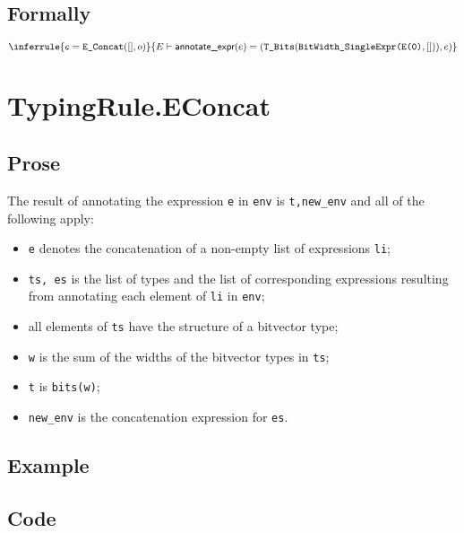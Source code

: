 \documentclass{book}
\newcommand\annotateexpr[1]{\textsf{annotate\_expr}(#1)}
\begin{document}
\begin{emptyformal}
    \subsection{Formally}
\[
\inferrule{e = \texttt{E\_Concat}([], o)}
{
E \entails  \annotateexpr{e} = (\TBits(\texttt{BitWidth\_SingleExpr(\Elit{0}}, [])), e)
}
\]
\end{emptyformal}


\section{TypingRule.EConcat \label{sec:TypingRule.EConcat}}

  \subsection{Prose}
  The result of annotating the expression \texttt{e} in \texttt{env} is
\texttt{t,new\_env} and all of the following apply:
  \begin{itemize}
  \item \texttt{e} denotes the concatenation of a non-empty list of expressions \texttt{li};
  \item \texttt{ts, es} is the list of types and the list of corresponding expressions resulting from annotating each element of \texttt{li} in \texttt{env};
  \item all elements of \texttt{ts} have the structure of a bitvector type;
  \item \texttt{w} is the sum of the widths of the bitvector types in \texttt{ts};
  \item \texttt{t} is \texttt{bits(w)};
  \item \texttt{new\_env} is the concatenation expression for \texttt{es}.
  \end{itemize}

  \subsection{Example}

  \subsection{Code}
\end{document}
